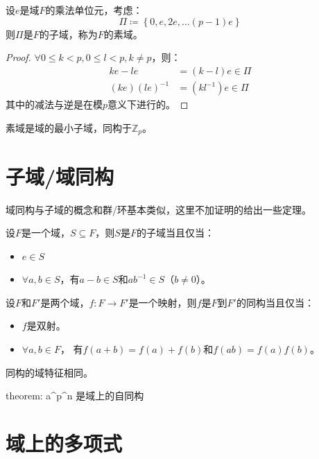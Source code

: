 \begin{definition}[素域]
    设\(e\)是域\(F\)的乘法单位元，考虑：\[
        \Pi \coloneqq \left\{ 0, e, 2e ,\dots (p-1)e \right\}
    \]
    则\(\Pi\)是\(F\)的子域，称为\(F\)的素域。
\end{definition}

\begin{proof}
    \(\forall 0\leq k< p, 0\leq l<p, k\neq p\)，则：
    \begin{align*}
        ke-le & = (k-l)e \in \Pi \\
        (ke)(le)^{-1}&= (kl^{-1})e \in \Pi
    \end{align*}
    其中的减法与逆是在模\(p\)意义下进行的。
\end{proof}

素域是域的最小子域，同构于\(\mathbb{Z}_{p}\)。

\section{子域/域同构}

域同构与子域的概念和群/环基本类似，这里不加证明的给出一些定理。

\begin{theorem}[子域的判定]
    设\(F\)是一个域，\(S\subseteq F\)，则\(S\)是\(F\)的子域当且仅当：
    \begin{itemize}
        \item \(e \in S \)
        \item \(\forall a,b \in S\)，有\(a-b \in S\)和\(ab^{-1} \in
            S\)（\(b \neq 0\)）。
    \end{itemize}
\end{theorem}

\begin{theorem}[域同构]
    设\(F\)和\(F'\)是两个域，\(f:F \to F'\)是一个映射，则\(f\)是\(F\)到\(F'\)的同构当且仅当：
    \begin{itemize}
        \item \(f\)是双射。
        \item \(\forall a,b \in F\)，
            有\(f(a+b)=f(a)+f(b)\)和\(f(ab)=f(a)f(b)\)。
    \end{itemize}
\end{theorem}
同构的域特征相同。

theorem: a^{p^{n}} 是域上的自同构
\section{域上的多项式}

